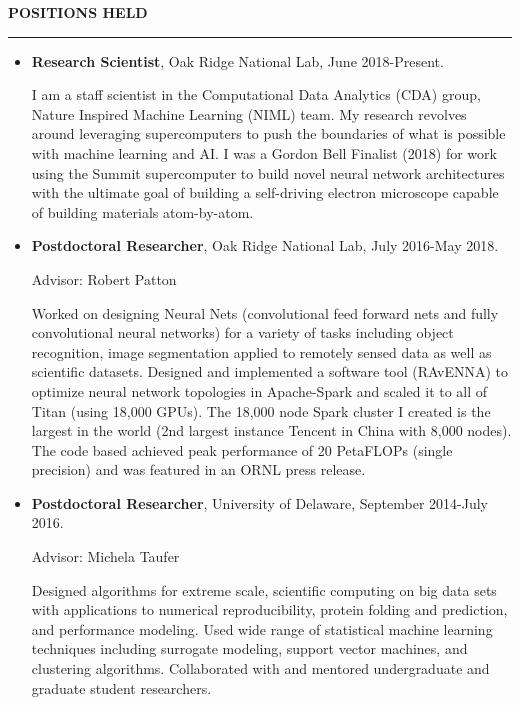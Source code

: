 \documentclass{article}
\begin{document}
\LARGE
\noindent \textbf{POSITIONS HELD}\normalsize

\noindent \rule{\textwidth}{1px}

	\begin{itemize}
        \item \textbf{Research Scientist}, Oak Ridge National Lab, June 2018-Present.

        I am a staff scientist in the Computational Data Analytics (CDA) group, Nature Inspired
        Machine Learning (NIML) team.  My research revolves around leveraging supercomputers
        to push the boundaries of what is possible with machine learning and AI.
        I was a Gordon Bell Finalist (2018) for work using the Summit supercomputer to 
        build novel neural network architectures with the ultimate goal of building a 
        self-driving electron microscope capable of building materials atom-by-atom.

		\item \textbf{Postdoctoral Researcher}, Oak Ridge National Lab, July 2016-May 2018.
		
		Advisor: Robert Patton

		Worked on designing Neural Nets (convolutional feed forward nets and fully
        convolutional neural networks) for a variety of tasks including object recognition,
        image segmentation applied to remotely sensed data as well as scientific datasets.
        Designed and implemented a software tool (RAvENNA) to optimize neural network topologies
        in Apache-Spark and scaled it to all of Titan (using 18,000 GPUs).
		The 18,000 node Spark cluster I created is the largest in the world 
		(2nd largest instance Tencent in China with 8,000 nodes).  The code based achieved peak performance
		of 20 PetaFLOPs (single precision) and was featured in an ORNL press release.

		\item \textbf{Postdoctoral Researcher}, University of Delaware, September 2014-July 2016.

		Advisor: Michela Taufer

		Designed algorithms for extreme scale, scientific computing on big data sets with applications to numerical reproducibility, protein folding and prediction, and performance modeling.
		Used wide range of statistical machine learning techniques including surrogate modeling, support vector machines, and clustering algorithms.
		Collaborated with and mentored undergraduate and graduate student researchers.



\end{itemize}
\end{document}
